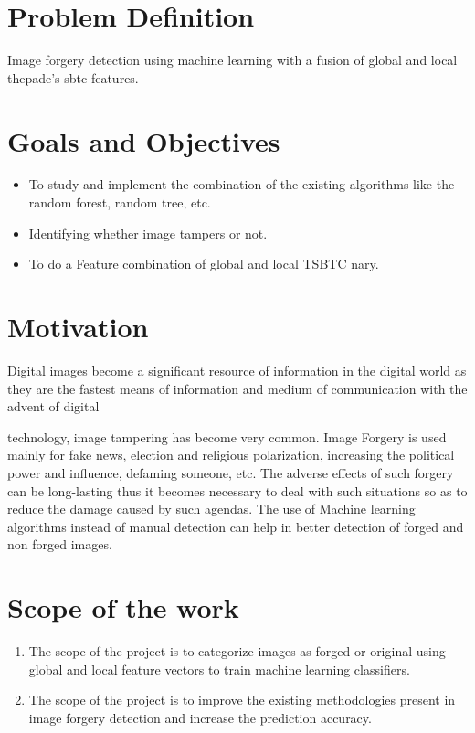 \section{Problem Definition}
	
Image forgery detection using machine learning with a fusion of global and local thepade’s sbtc features.

\section{Goals and Objectives}
\begin{itemize}
	\item	To study and implement the combination of the existing algorithms like the random forest, random tree,	etc.
	\item Identifying whether image tampers or not.
	\item To do a Feature combination of global and local TSBTC nary.
	\end{itemize}
	
\section{Motivation}
Digital images become a significant resource of information in the digital world as they are the fastest means of information and medium of communication with the advent of digital

technology, image tampering has become very common. Image Forgery is used mainly for fake news, election and religious polarization, increasing the political power and influence, defaming someone, etc. The adverse effects of such forgery can be long-lasting thus it becomes necessary to deal with such situations so as to reduce the damage caused by such agendas. The use of Machine learning algorithms instead of manual detection can help in better detection of forged and non forged images.



\section{Scope of the work}
\begin{enumerate}
	\item	The scope of the project is to categorize images as forged or original using global and local feature vectors to train machine learning classifiers.
	\item The scope of the project is to improve the existing methodologies present in image forgery detection and increase the prediction accuracy.
\end{enumerate}

